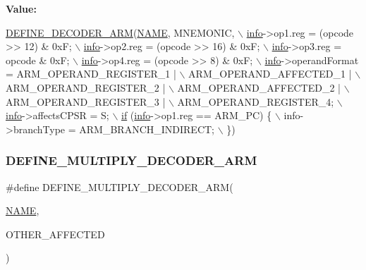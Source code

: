 {\bfseries Value\+:}
\begin{DoxyCode}
\mbox{\hyperlink{decoder-arm_8c_a4fe6e4683fda92c7774b0678f5ab95cc}{DEFINE\_DECODER\_ARM}}(\mbox{\hyperlink{inflate_8h_a164ea0159d5f0b5f12a646f25f99eceaa67bc2ced260a8e43805d2480a785d312}{NAME}}, MNEMONIC, \(\backslash\)
        \mbox{\hyperlink{libretro_8h_structretro__game__info}{info}}->op1.reg = (opcode >> 12) & 0xF; \(\backslash\)
        \mbox{\hyperlink{libretro_8h_structretro__game__info}{info}}->op2.reg = (opcode >> 16) & 0xF; \(\backslash\)
        \mbox{\hyperlink{libretro_8h_structretro__game__info}{info}}->op3.reg = opcode & 0xF; \(\backslash\)
        \mbox{\hyperlink{libretro_8h_structretro__game__info}{info}}->op4.reg = (opcode >> 8) & 0xF; \(\backslash\)
        \mbox{\hyperlink{libretro_8h_structretro__game__info}{info}}->operandFormat = ARM\_OPERAND\_REGISTER\_1 | \(\backslash\)
            ARM\_OPERAND\_AFFECTED\_1 | \(\backslash\)
            ARM\_OPERAND\_REGISTER\_2 | \(\backslash\)
            ARM\_OPERAND\_AFFECTED\_2 | \(\backslash\)
            ARM\_OPERAND\_REGISTER\_3 | \(\backslash\)
            ARM\_OPERAND\_REGISTER\_4; \(\backslash\)
        \mbox{\hyperlink{libretro_8h_structretro__game__info}{info}}->affectsCPSR = S; \(\backslash\)
        \mbox{\hyperlink{isa-arm_8c_a0736bf8f9c6b829a423d7d7a43b781e8}{if}} (\mbox{\hyperlink{libretro_8h_structretro__game__info}{info}}->op1.reg == ARM\_PC) \{ \(\backslash\)
            info->branchType = ARM\_BRANCH\_INDIRECT; \(\backslash\)
        \})
\end{DoxyCode}
\mbox{\label{decoder-arm_8c_a7ac82bf2f1f6edae73a429cb9baaf3f1}} 
\subsubsection{\texorpdfstring{D\+E\+F\+I\+N\+E\+\_\+\+M\+U\+L\+T\+I\+P\+L\+Y\+\_\+\+D\+E\+C\+O\+D\+E\+R\+\_\+\+A\+RM}{DEFINE\_MULTIPLY\_DECODER\_ARM}}
{\footnotesize\ttfamily \#define D\+E\+F\+I\+N\+E\+\_\+\+M\+U\+L\+T\+I\+P\+L\+Y\+\_\+\+D\+E\+C\+O\+D\+E\+R\+\_\+\+A\+RM(\begin{DoxyParamCaption}\item[{}]{\mbox{\hyperlink{inflate_8h_a164ea0159d5f0b5f12a646f25f99eceaa67bc2ced260a8e43805d2480a785d312}{N\+A\+ME}},  }\item[{}]{O\+T\+H\+E\+R\+\_\+\+A\+F\+F\+E\+C\+T\+ED }\end{DoxyParamCaption})}

